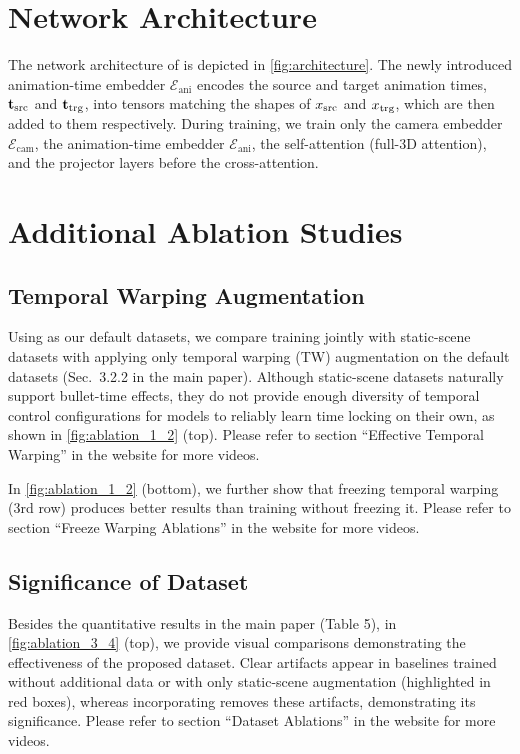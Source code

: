 \clearpage
\appendix


\section{Network Architecture}

The network architecture of \nameMethod is depicted in \cref{fig:architecture}. 
The newly introduced animation-time embedder $\mathcal{E}_{\text{ani}}$ encodes the source and target animation times, $\mathbf{t}_{\text{src}}$ and $\mathbf{t}_{\text{trg}}$, into tensors matching the shapes of $x_{\text{src}}$ and $x_{\text{trg}}$, which are then added to them respectively.
During training, we train only the camera embedder $\mathcal{E}_{\text{cam}}$, the animation-time embedder $\mathcal{E}_{\text{ani}}$, the self-attention (full-3D attention), and the projector layers before the cross-attention.







\section{Additional Ablation Studies}

\subsection{Temporal Warping Augmentation}

Using \cite{Bai2025,bai2024syncammaster} as our default datasets, we compare training jointly with static-scene datasets \cite{zhou2018stereo,li2019mannequin} with applying only temporal warping (TW) augmentation on the default datasets (Sec.~3.2.2 in the main paper). Although static-scene datasets naturally support bullet-time effects, they do not provide enough diversity of temporal control configurations for models to reliably learn time locking on their own, as shown in \cref{fig:ablation_1_2} (top). Please refer to section ``Effective Temporal Warping'' in the website for more videos.

In \cref{fig:ablation_1_2} (bottom), we further show that freezing temporal warping (3rd row) produces better results than training without freezing it. Please refer to section ``Freeze Warping Ablations'' in the website for more videos. 

\subsection{Significance of \texttt{\nameDataset} Dataset}
Besides the quantitative results in the main paper (Table 5), in \cref{fig:ablation_3_4} (top), we provide visual comparisons demonstrating the effectiveness of the proposed \texttt{\nameDataset} dataset. 
Clear artifacts appear in baselines trained without additional data or with only static-scene augmentation (highlighted in red boxes), whereas incorporating \texttt{\nameDataset} removes these artifacts, demonstrating its significance. Please refer to section ``Dataset Ablations'' in the website for more videos.

